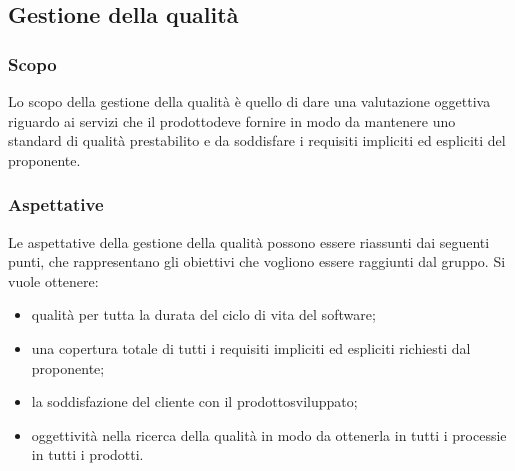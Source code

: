 \subsection{Gestione della qualità}
\subsubsection{Scopo}
Lo scopo della gestione della qualità è quello di dare una valutazione oggettiva riguardo ai servizi che il prodotto\glosp deve fornire in modo da mantenere uno standard di qualità prestabilito e da soddisfare i requisiti impliciti ed espliciti del proponente.
\subsubsection{Aspettative}
Le aspettative della gestione della qualità possono essere riassunti dai seguenti punti, che rappresentano gli obiettivi che vogliono essere raggiunti dal gruppo. Si vuole ottenere:
\begin{itemize}
	\item qualità per tutta la durata del ciclo di vita del software;
	\item una copertura totale di tutti i requisiti impliciti ed espliciti richiesti dal proponente;
	\item la soddisfazione del cliente con il prodotto\glosp sviluppato;
	\item oggettività nella ricerca della qualità in modo da ottenerla in tutti i processi\glosp e in tutti i prodotti\glo.
\end{itemize}

